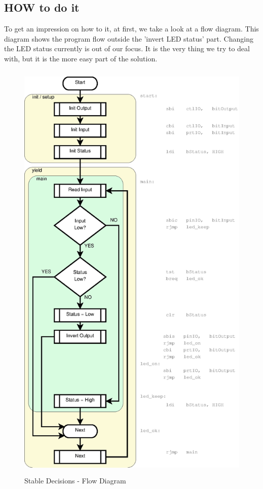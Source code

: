 \subsection{HOW to do it}

To get an impression on how to it, at first, we take a look at a flow diagram. This diagram shows the program flow outside the 'invert LED status' part. Changing the LED status currently is out of our focus. It is the very thing we try to deal with, but it is the more easy part of the solution.

\begin{figure}[htbp]
  \centering
  \includegraphics[height=210mm]{LED/S005_stable-decisions+symbols.eps}
  \caption{Stable Decisions - Flow Diagram}
  \label{S005FlowDiagam}
\end{figure}

